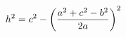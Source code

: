 \documentclass[preview]{standalone}
\begin{document}
\begin{align*}
\special{dvisvgm:raw <g id='unique000'>}h^2 = c^2 - \left(\frac{a^2 + c^2 - b^2}{2a}\right)^2\special{dvisvgm:raw </g>}
\end{align*}
\end{document}

